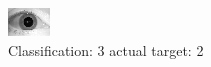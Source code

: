 \begin{figure}[h!]
\begin{center}
\includegraphics[width=0.60\columnwidth]{figures/ID1788_class_3_target_2.png}
\end{center}
\caption{ Classification: 3 actual target: 2}
\label{fig:ID1788_class_3_target_2}
\end{figure}
